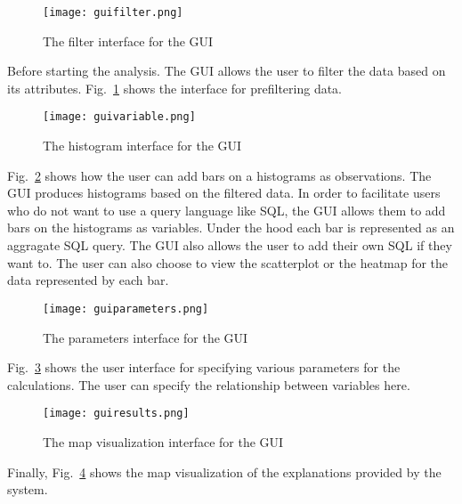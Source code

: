 \begin{figure}[h]
\begin{center}
    \texttt{[image: guifilter.png]}
\end{center}
\caption{The filter interface for the GUI}
\label{fig:guifilter}
\end{figure}

Before starting the analysis. The GUI allows the user to filter the data based on its attributes. Fig.~\ref{fig:guifilter} shows the interface for prefiltering data.

\begin{figure}[h]
  \begin{center}
    \texttt{[image: guivariable.png]}
  \end{center}
\caption{The histogram interface for the GUI}
\label{fig:guivariable}
\end{figure}

Fig.~\ref{fig:guivariable} shows how the user can add bars on a histograms as observations. The GUI produces histograms based on the filtered data. In order to facilitate users who do not want to use a query language like SQL, the GUI allows them to add bars on the histograms as variables. Under the hood each bar is represented as an aggragate SQL query. The GUI also allows the user to add their own SQL if they want to. The user can also choose to view the scatterplot or the heatmap for the data represented by each bar.

\begin{figure}[h]
  \begin{center}
    \texttt{[image: guiparameters.png]}
  \end{center}
\caption{The parameters interface for the GUI}
\label{fig:guiparameters}
\end{figure}

Fig.~\ref{fig:guiparameters} shows the user interface for specifying various parameters for the calculations. The user can specify the relationship between variables here.

\begin{figure}[h]
  \begin{center}
    \texttt{[image: guiresults.png]}
  \end{center}
\caption{The map visualization interface for the GUI}
\label{fig:guiresults}
\end{figure}

Finally, Fig.~\ref{fig:guiresults} shows the map visualization of the explanations provided by the system.
